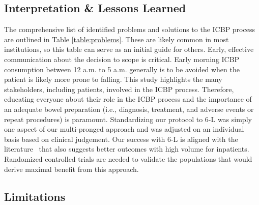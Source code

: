 \documentclass[Bprep]{subfiles}
\begin{document}
\subsection{Interpretation \& Lessons Learned}\label{subsec:ILL}
\hypertarget{Interpretation \& Lessons Learned}{}

The comprehensive list of identified problems and solutions to the ICBP process are outlined in Table \ref{table:problems}. These are likely common in most institutions, so this table can serve as an initial guide for others. Early, effective communication about the decision to scope is critical. Early morning ICBP consumption between 12 a.m. to 5 a.m. generally is to be avoided when the patient is likely more prone to falling. This study highlights the many stakeholders, including patients, involved in the ICBP process. Therefore, educating everyone about their role in the ICBP process and the importance of an adequate bowel preparation (i.e., diagnosis, treatment, and adverse events or repeat procedures) is paramount. Standardizing our protocol to 6-L was simply one aspect of our multi-pronged approach and was adjusted on an individual basis based on clinical judgement. Our success with 6-L is aligned with the literature~\cite{Argyropoulos2018-cg} that also suggests better outcomes with high volume for inpatients. Randomized controlled trials are needed to validate the populations that would derive maximal benefit from this approach.\\

\subsection{Limitations}\label{subsec:Limitations}
\hypertarget{Limitations}{}
\end{document}
